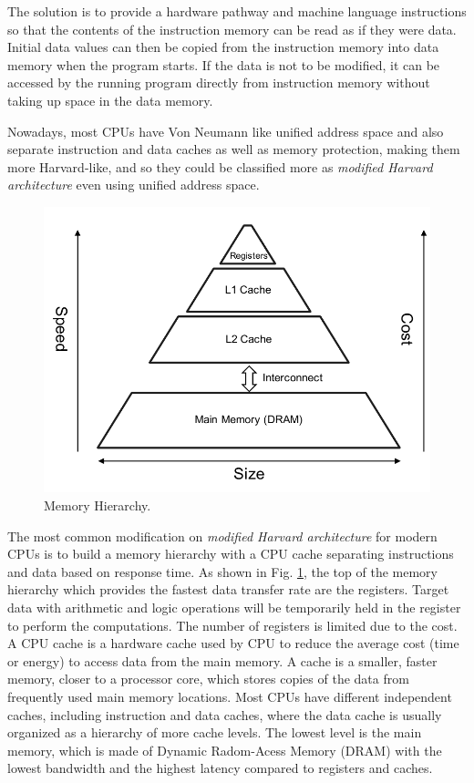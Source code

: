The solution is to provide a hardware pathway and machine language instructions so that the contents of the instruction memory can be read as if they were data. Initial data values can then be copied from the instruction memory into data memory when the program starts. If the data is not to be modified, it can be accessed by the running program directly from instruction memory without taking up space in the data memory.

Nowadays, most CPUs have Von Neumann like unified address space and also separate instruction and data caches as well as memory protection, making them more Harvard-like, and so they could be classified more as \textit{modified Harvard architecture} even using unified address space.

\begin{figure}[htbp]
	\centering
	\includegraphics[width=4.6in]{fig/memory.pdf}
	\caption{Memory Hierarchy.}
	\label{fig:memory-access}
\end{figure}

The most common modification on \textit{modified Harvard architecture}  for modern CPUs is to build a memory hierarchy with a CPU cache separating instructions and data based on response time. As shown in Fig. \ref{fig:memory-access}, the top of the memory hierarchy which provides the fastest data transfer rate are the registers. Target data with arithmetic and logic operations will be temporarily held in the register to perform the computations. The number of registers is limited due to the cost. A CPU cache is a hardware cache used by CPU to reduce the average cost (time or energy) to access data from the main memory. A cache is a smaller, faster memory, closer to a processor core, which stores copies of the data from frequently used main memory locations. Most CPUs have different independent caches, including instruction and data caches, where the data cache is usually organized as a hierarchy of more cache levels. The lowest level is the main memory, which is made of Dynamic Radom-Acess Memory (DRAM) with the lowest bandwidth and the highest latency compared to registers and caches.

